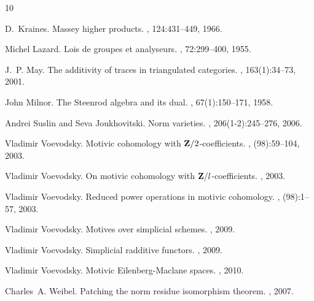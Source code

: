 \documentclass[11pt]{article}
\begin{document}
\def\cprime{$'$}
\begin{thebibliography}{10}

D.~Kraines.
\newblock Massey higher products.
, 124:431--449, 1966.

Michel Lazard.
\newblock Lois de groupes et analyseurs.
, 72:299--400, 1955.

J.~P. May.
\newblock The additivity of traces in triangulated categories.
, 163(1):34--73, 2001.

John Milnor.
\newblock The {S}teenrod algebra and its dual.
, 67(1):150--171, 1958.

Andrei Suslin and Seva Joukhovitski.
\newblock Norm varieties.
, 206(1-2):245--276, 2006.

Vladimir Voevodsky.
\newblock Motivic cohomology with {${\bf Z}/2$}-coefficients.
, (98):59--104, 2003.

Vladimir Voevodsky.
\newblock On motivic cohomology with ${\bf Z\rm}/l$-coefficients.
, 2003.

Vladimir Voevodsky.
\newblock Reduced power operations in motivic cohomology.
, (98):1--57, 2003.

Vladimir Voevodsky.
\newblock Motives over simplicial schemes.
, 2009.

Vladimir Voevodsky.
\newblock Simplicial radditive functors.
, 2009.

Vladimir Voevodsky.
\newblock Motivic {E}ilenberg-{M}aclane spaces.
, 2010.

Charles~A. Weibel.
\newblock Patching the norm residue isomorphism theorem.
, 2007.

\end{thebibliography}


\comment{
%


%
}










%
\end{document}
